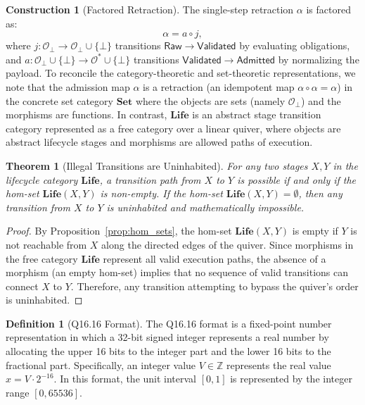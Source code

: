 \documentclass[11pt,oneside]{book}
\theoremstyle{definition}
\newtheorem{definition}{Definition}[chapter]
\newtheorem{construction}{Construction}[chapter]
\theoremstyle{plain}
\newtheorem{theorem}{Theorem}[chapter]
\theoremstyle{remark}
\newcommand{\Obs}{\mathcal{O}}                 %
\newcommand{\Obsbot}{\Obs_{\bot}}             %
\newcommand{\adm}{\alpha}                      %
\newcommand{\Rfsl}{\bot}                        %
\newcommand{\Raw}{\mathsf{Raw}}
\newcommand{\Val}{\mathsf{Validated}}
\newcommand{\Admd}{\mathsf{Admitted}}
\newcommand{\Life}{\mathbf{Life}}
\begin{document}
\begin{construction}[Factored Retraction]\label{con:factored_retraction}
The single-step retraction $\adm$ is factored as:
\[
\adm = a \circ j,
\] %
where $j: \Obsbot \to \Obsbot \cup \{\Rfsl\}$ transitions $\Raw \to \Val$ by evaluating obligations, and $a: \Obsbot \cup \{\Rfsl\} \to \Obs^* \cup \{\Rfsl\}$ transitions $\Val \to \Admd$ by normalizing the payload. %
To reconcile the category-theoretic and set-theoretic representations, we note that the admission map $\adm$ is a retraction (an idempotent map $\adm \circ \adm = \adm$) in the concrete set category $\mathbf{Set}$ where the objects are sets (namely $\Obsbot$) and the morphisms are functions. %
In contrast, $\Life$ is an abstract stage transition category represented as a free category over a linear quiver, where objects are abstract lifecycle stages and morphisms are allowed paths of execution. %
\end{construction}

\begin{theorem}[Illegal Transitions are Uninhabited]\label{thm:uninhabited}
For any two stages $X, Y$ in the lifecycle category $\Life$, a transition path from $X$ to $Y$ is possible if and only if the hom-set $\Life(X, Y)$ is non-empty. %
If the hom-set $\Life(X, Y) = \emptyset$, then any transition from $X$ to $Y$ is uninhabited and mathematically impossible. %
\end{theorem}

\begin{proof}
By Proposition~\ref{prop:hom_sets}, the hom-set $\Life(X, Y)$ is empty if $Y$ is not reachable from $X$ along the directed edges of the quiver. %
Since morphisms in the free category $\Life$ represent all valid execution paths, the absence of a morphism (an empty hom-set) implies that no sequence of valid transitions can connect $X$ to $Y$. %
Therefore, any transition attempting to bypass the quiver's order is uninhabited. %
\end{proof}

\begin{definition}[Q16.16 Format]\label{def:q16_16}
The Q16.16 format is a fixed-point number representation in which a 32-bit signed integer represents a real number by allocating the upper 16 bits to the integer part and the lower 16 bits to the fractional part. %
Specifically, an integer value $V \in \mathbb{Z}$ represents the real value $x = V \cdot 2^{-16}$. %
In this format, the unit interval $[0, 1]$ is represented by the integer range $[0, 65536]$. %
\end{definition}
\end{document}

